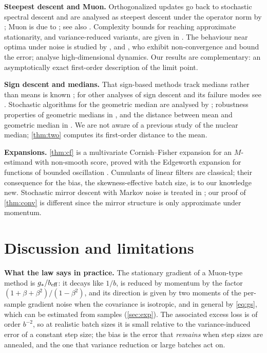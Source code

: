 \documentclass{article}
\theoremstyle{plain}
\theoremstyle{definition}
\theoremstyle{remark}
\begin{document}
\textbf{Steepest descent and Muon.} Orthogonalized updates go back to stochastic spectral descent
\citep{carlson2015stochastic} and are analysed as steepest descent under the operator norm by \citet{bernstein2024old};
Muon is due to \citet{jordan2024muon}; see also \citet{lau2025polargrad,shulgin2026quadratic}. Complexity bounds for reaching approximate stationarity, and variance-reduced variants, are given in
\citet{huang2026muon,liu2025marsm}. The behaviour near optima under noise is
studied by \citet{xie2026muon}, \citet{chen2026when} and \citet{do2026muon}, who exhibit non-convergence and bound the
error; \citet{paquette2026phases} analyse high-dimensional dynamics. Our results are complementary: an asymptotically
exact first-order description of the limit point.

\textbf{Sign descent and medians.} That sign-based methods track medians rather than means is known
\citep{bernstein2019majority,chen2020distributed}; for other analyses of sign descent and its failure modes see
\citet{safaryan2021stochastic,balles2020geometry,karimireddy2019error}. Stochastic
algorithms for the geometric median are analysed by \citet{cardot2013efficient}; robustness properties of geometric
medians in \citet{minsker2015geometric,minskerstrawn}, and the distance between mean and geometric median in
\citet{schwank}. We are not aware of a previous study of the nuclear median; \cref{thm:two} computes its first-order
distance to the mean.

\textbf{Expansions.} \cref{thm:cf} is a multivariate Cornish--Fisher expansion \citep{cornish1938moments} for an
$M$-estimand with non-smooth score, proved with the Edgeworth expansion for functions of bounded oscillation
\citep[Thm.~20.1]{br}. Cumulants of linear filters are classical; their consequence for the bias, the skewness-effective batch size, is to
our knowledge new.
Stochastic mirror descent with Markov noise is treated in \citet{duchiemd}; our proof of \cref{thm:conv} is different
since the mirror structure is only approximate under momentum.

\section{Discussion and limitations}\label{sec:disc}

\textbf{What the law says in practice.} The stationary gradient of a Muon-type method is $g_\ast/b_{\mathrm{eff}}$: it decays like
$1/b$, is reduced by momentum by the factor $(1+\beta+\beta^2)/(1-\beta^2)$, and its direction is given by two moments
of the per-sample gradient noise when the covariance is isotropic, and in general by \eqref{eq:gs}, which can be
estimated from samples (\cref{sec:exp}). The associated excess loss is of order
$b^{-2}$, so at realistic batch sizes it is small relative to the variance-induced error of a constant step size; the
bias is the error that \emph{remains} when step sizes are annealed, and the one that variance reduction or large
batches act on.
\end{document}
